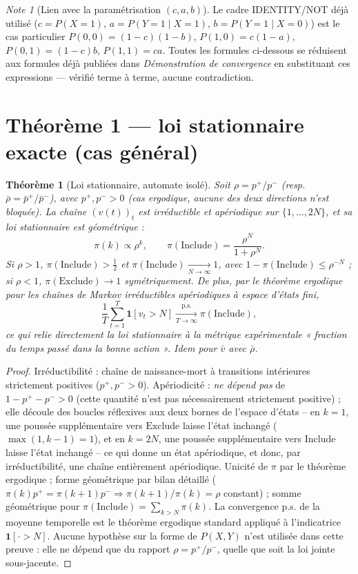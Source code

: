 \documentclass[12pt,a4paper]{article}
\newtheorem{theorem}{Théorème}[section]
\theoremstyle{remark}
\newtheorem{note}{Note}[section]
\newcommand{\Inc}{\ensuremath{\mathrm{Include}}}
\newcommand{\Exc}{\ensuremath{\mathrm{Exclude}}}
\newcommand{\vbar}{\bar{v}}
\begin{document}
\begin{note}[Lien avec la paramétrisation $(c,a,b)$]
Le cadre IDENTITY/NOT déjà utilisé ($c{=}P(X{=}1)$, $a{=}P(Y{=}1\mid X{=}1)$,
$b{=}P(Y{=}1\mid X{=}0)$) est le cas particulier
$P(0,0){=}(1{-}c)(1{-}b)$, $P(1,0){=}c(1{-}a)$, $P(0,1){=}(1{-}c)b$,
$P(1,1){=}ca$. Toutes les formules ci-dessous se réduisent aux formules déjà
publiées dans \textit{Démonstration de convergence} en substituant ces
expressions --- vérifié terme à terme, aucune contradiction.
\end{note}

\section{Théorème 1 --- loi stationnaire exacte (cas général)}

\begin{theorem}[Loi stationnaire, automate isolé]\label{thm:stationnaire}
Soit $\rho = p^+/p^-$ (resp.\ $\bar\rho=\bar p^+/\bar p^-$), avec $p^+,p^->0$
(cas ergodique, aucune des deux directions n'est bloquée). La chaîne $(v(t))_t$
est irréductible et apériodique sur $\{1,\ldots,2N\}$, et sa loi stationnaire
est géométrique :
\[
  \pi(k) \propto \rho^k, \qquad
  \boxed{\pi(\Inc) = \frac{\rho^N}{1+\rho^N}.}
\]
Si $\rho>1$, $\pi(\Inc)>\tfrac12$ et $\pi(\Inc)\xrightarrow[N\to\infty]{}1$, avec
$1-\pi(\Inc)\le\rho^{-N}$ ; si $\rho<1$, $\pi(\Exc)\to1$ symétriquement. De plus,
par le théorème ergodique pour les chaînes de Markov irréductibles apériodiques
à espace d'états fini,
\[
  \frac1T\sum_{t=1}^{T}\mathbf 1[v_t>N] \xrightarrow[T\to\infty]{\text{p.s.}} \pi(\Inc),
\]
ce qui relie directement la loi stationnaire à la métrique expérimentale
« fraction du temps passé dans la bonne action ». Idem pour $\vbar$ avec $\bar\rho$.
\end{theorem}

\begin{proof}
Irréductibilité : chaîne de naissance-mort à transitions intérieures
strictement positives ($p^+,p^->0$). Apériodicité : \emph{ne dépend pas} de
$1-p^+-p^->0$ (cette quantité n'est pas nécessairement strictement positive) ;
elle découle des boucles réflexives aux deux bornes de l'espace d'états -- en
$k=1$, une poussée supplémentaire vers $\Exc$ laisse l'état inchangé
($\max(1,k-1)=1$), et en $k=2N$, une poussée supplémentaire vers $\Inc$ laisse
l'état inchangé -- ce qui donne un état apériodique, et donc, par
irréductibilité, une chaîne entièrement apériodique. Unicité de $\pi$ par le
théorème ergodique ; forme géométrique par bilan détaillé
($\pi(k)p^+=\pi(k{+}1)p^- \Rightarrow \pi(k{+}1)/\pi(k)=\rho$ constant) ;
somme géométrique pour $\pi(\Inc)=\sum_{k>N}\pi(k)$. La convergence p.s. de la
moyenne temporelle est le théorème ergodique standard appliqué à l'indicatrice
$\mathbf 1[\cdot>N]$. Aucune hypothèse sur la forme de $P(X,Y)$ n'est utilisée
dans cette preuve : elle ne dépend que du rapport $\rho=p^+/p^-$, quelle que
soit la loi jointe sous-jacente.
\end{proof}
\end{document}
